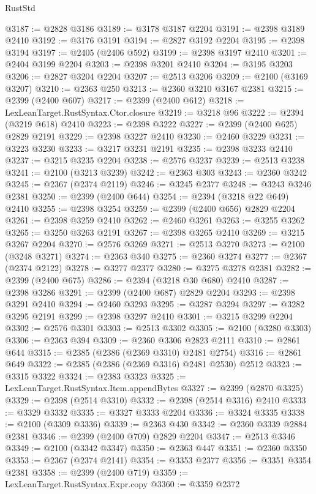 \begin{lexlean}{RustStd}
\begin{coremodule}
@3187 := @2828 @3186
@3189 := @3178 @3187 @2204
@3191 := @2398 @3189 @2410
@3192 := @3176 @3191
@3194 := @2827 @3192 @2204
@3195 := @2398 @3194
@3197 := @2405 (@2406 @592)
@3199 := @2398 @3197 @2410
@3201 := @2404 @3199 @2204
@3203 := @2398 @3201 @2410
@3204 := @3195 @3203
@3206 := @2827 @3204 @2204
@3207 := @2513 @3206
@3209 := @2100 (@3169 @3207)
@3210 := @2363 @250
@3213 := @2360 @3210 @3167 @2381
@3215 := @2399 (@2400 @607)
@3217 := @2399 (@2400 @612)
@3218 := LexLeanTarget.RustSyntax.Ctor.closure
@3219 := @3218 @96
@3222 := @2394 (@3219 @618) @2410
@3223 := @2398 @3222
@3227 := @2399 (@2400 @625) @2829 @2191
@3229 := @2398 @3227 @2410
@3230 := @2460 @3229
@3231 := @3223 @3230
@3233 := @3217 @3231 @2191
@3235 := @2398 @3233 @2410
@3237 := @3215 @3235 @2204
@3238 := @2576 @3237
@3239 := @2513 @3238
@3241 := @2100 (@3213 @3239)
@3242 := @2363 @303
@3243 := @2360 @3242
@3245 := @2367 (@2374 @2119)
@3246 := @3245 @2377
@3248 := @3243 @3246 @2381
@3250 := @2399 (@2400 @644)
@3254 := @2394 (@3218 @22 @649) @2410
@3255 := @2398 @3254
@3259 := @2399 (@2400 @656) @2829 @2204
@3261 := @2398 @3259 @2410
@3262 := @2460 @3261
@3263 := @3255 @3262
@3265 := @3250 @3263 @2191
@3267 := @2398 @3265 @2410
@3269 := @3215 @3267 @2204
@3270 := @2576 @3269
@3271 := @2513 @3270
@3273 := @2100 (@3248 @3271)
@3274 := @2363 @340
@3275 := @2360 @3274
@3277 := @2367 (@2374 @2122)
@3278 := @3277 @2377
@3280 := @3275 @3278 @2381
@3282 := @2399 (@2400 @675)
@3286 := @2394 (@3218 @30 @680) @2410
@3287 := @2398 @3286
@3291 := @2399 (@2400 @687) @2829 @2204
@3293 := @2398 @3291 @2410
@3294 := @2460 @3293
@3295 := @3287 @3294
@3297 := @3282 @3295 @2191
@3299 := @2398 @3297 @2410
@3301 := @3215 @3299 @2204
@3302 := @2576 @3301
@3303 := @2513 @3302
@3305 := @2100 (@3280 @3303)
@3306 := @2363 @394
@3309 := @2360 @3306 @2823 @2111
@3310 := @2861 @644
@3315 := @2385 (@2386 (@2369 @3310) @2481 @2754)
@3316 := @2861 @649
@3322 := @2385 (@2386 (@2369 @3316) @2481 @2530) @2512
@3323 := @3315 @3322
@3324 := @2383 @3323
@3325 := LexLeanTarget.RustSyntax.Item.appendBytes
@3327 := @2399 (@2870 @3325)
@3329 := @2398 (@2514 @3310)
@3332 := @2398 (@2514 @3316) @2410
@3333 := @3329 @3332
@3335 := @3327 @3333 @2204
@3336 := @3324 @3335
@3338 := @2100 (@3309 @3336)
@3339 := @2363 @430
@3342 := @2360 @3339 @2884 @2381
@3346 := @2399 (@2400 @709) @2829 @2204
@3347 := @2513 @3346
@3349 := @2100 (@3342 @3347)
@3350 := @2363 @447
@3351 := @2360 @3350
@3353 := @2367 (@2374 @2141)
@3354 := @3353 @2377
@3356 := @3351 @3354 @2381
@3358 := @2399 (@2400 @719)
@3359 := LexLeanTarget.RustSyntax.Expr.copy
@3360 := @3359 @2372

\end{coremodule}
\end{lexlean}
